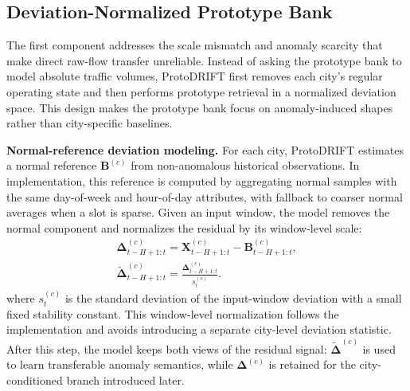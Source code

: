 \subsection{Deviation-Normalized Prototype Bank}

The first component addresses the scale mismatch and anomaly scarcity that make direct raw-flow transfer unreliable. Instead of asking the prototype bank to model absolute traffic volumes, ProtoDRIFT first removes each city's regular operating state and then performs prototype retrieval in a normalized deviation space. This design makes the prototype bank focus on anomaly-induced shapes rather than city-specific baselines.

\textbf{Normal-reference deviation modeling.} For each city, ProtoDRIFT estimates a normal reference $\mathbf{B}^{(c)}$ from non-anomalous historical observations. In implementation, this reference is computed by aggregating normal samples with the same day-of-week and hour-of-day attributes, with fallback to coarser normal averages when a slot is sparse. Given an input window, the model removes the normal component and normalizes the residual by its window-level scale:
\begin{equation}
\begin{gathered}
    \boldsymbol{\Delta}^{(c)}_{t-H+1:t}
    =\mathbf{X}^{(c)}_{t-H+1:t}-\mathbf{B}^{(c)}_{t-H+1:t}, \\
    \widetilde{\boldsymbol{\Delta}}^{(c)}_{t-H+1:t}
    =\frac{\boldsymbol{\Delta}^{(c)}_{t-H+1:t}}{s^{(c)}_t}.
\end{gathered}
\end{equation}
where $s^{(c)}_t$ is the standard deviation of the input-window deviation with a small fixed stability constant. This window-level normalization follows the implementation and avoids introducing a separate city-level deviation statistic. After this step, the model keeps both views of the residual signal: $\widetilde{\boldsymbol{\Delta}}^{(c)}$ is used to learn transferable anomaly semantics, while $\boldsymbol{\Delta}^{(c)}$ is retained for the city-conditioned branch introduced later.

